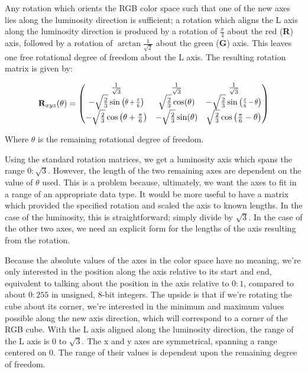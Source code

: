 Any rotation which orients the RGB color space such that one of the new axes lies along the luminosity direction is sufficient; a rotation which aligns the L axis along the luminosity direction is produced by a rotation of $\frac{\pi}4$ about the red (\textbf{R}) axis, followed by a rotation of $\arctan{\frac{1}{\sqrt{2}}}$ about the green (\textbf{G}) axis. This leaves one free rotational degree of freedom about the L axis. The resulting rotation matrix is given by:

\begin{equation}
\R_{xyz}(\theta) =
\begin{pmatrix}
 \frac{1}{\sqrt{3}} & \frac{1}{\sqrt{3}} & \frac{1}{\sqrt{3}} \\
 -\sqrt{\frac{2}{3}} \sine{\theta +\Pii{6} } & \sqrt{\frac{2}{3}} \cos (\theta ) & -\sqrt{\frac{2}{3}} \sine{\Pii{6}-\theta } \\
 -\sqrt{\frac{2}{3}} \cos \left(\theta +\Pii{6}\right) & -\sqrt{\frac{2}{3}} \sin (\theta ) & \sqrt{\frac{2}{3}} \cos \left(\Pii{6}-\theta \right) \\
\end{pmatrix}
\end{equation}


Where $\theta$ is the remaining rotational degree of freedom.

Using the standard rotation matrices, we get a luminosity axis which spans the range $0:\sqrt{3}$. However, the length of the two remaining axes are dependent on the value of $\theta$ used. This is a problem because, ultimately, we want the axes to fit in a range of an appropriate data type. It would be more useful to have a matrix which provided the specified rotation and scaled the axis to known lengths. In the case of the luminosity, this is straightforward; simply divide by $\sqrt{3}$. In the case of the other two axes, we need an explicit form for the lengths of the axis resulting from the rotation.

Because the absolute values of the axes in the color space have no meaning, we're only interested in the position along the axis relative to its start and end, equivalent to talking about the position in the axis relative to $0:1$, compared to about $0:255$ in unsigned, 8-bit integers. The upside is that if we're rotating the cube about its corner, we're interested in the minimum and maximum values possible along the new axis direction, which will correspond to a corner of the RGB cube. With the L axis aligned along the luminosity direction, the range of the L axis is 0 to $\sqrt{3}$. The x and y axes are symmetrical, spanning a range centered on 0. The range of their values is dependent upon the remaining degree of freedom.

